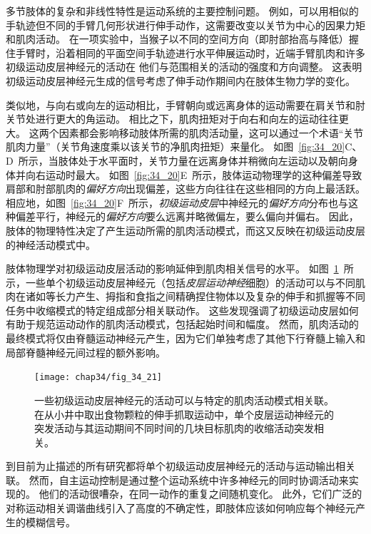 多节肢体的复杂和非线性特性是运动系统的主要控制问题。
例如，可以用相似的手轨迹但不同的手臂几何形状进行伸手动作，这需要改变以关节为中心的因果力矩和肌肉活动。
在一项实验中，当猴子以不同的空间方向（即肘部抬高与降低）握住手臂时，沿着相同的平面空间手轨迹进行水平伸展运动时，近端手臂肌肉和许多初级运动皮层神经元的活动在 他们与范围相关的活动的强度和方向调整。
这表明初级运动皮层神经元生成的信号考虑了伸手动作期间内在肢体生物力学的变化。


类似地，与向右或向左的运动相比，手臂朝向或远离身体的运动需要在肩关节和肘关节处进行更大的角运动。
相比之下，肌肉扭矩对于向右和向左的运动往往更大。
这两个因素都会影响移动肢体所需的肌肉活动量，这可以通过一个术语“关节肌肉力量”（关节角速度乘以该关节的净肌肉扭矩）来量化。
如图~\ref{fig:34_20}C、D~所示，当肢体处于水平面时，关节力量在远离身体并稍微向左运动以及朝向身体并向右运动时最大。
如图~\ref{fig:34_20}E~所示，肢体运动物理学的这种偏差导致肩部和肘部肌肉的\textit{偏好方向}出现偏差，这些方向往往在这些相同的方向上最活跃。
相应地，如图~\ref{fig:34_20}F~所示，\textit{初级运动皮层}中神经元的\textit{偏好方向}分布也与这种偏差平行，神经元的\textit{偏好方向}要么远离并略微偏左，要么偏向并偏右。
因此，肢体的物理特性决定了产生运动所需的肌肉活动模式，而这又反映在初级运动皮层的神经活动模式中。


肢体物理学对初级运动皮层活动的影响延伸到肌肉相关信号的水平。
如图~\ref{fig:34_21}~所示，一些单个初级运动皮层神经元（包括\textit{皮层运动神经}细胞）的活动可以与不同肌肉在诸如等长力产生、拇指和食指之间精确捏住物体以及复杂的伸手和抓握等不同任务中收缩模式的特定组成部分相关联动作。
这些发现强调了初级运动皮层如何有助于规范运动动作的肌肉活动模式，包括起始时间和幅度。
然而，肌肉活动的最终模式将仅由脊髓运动神经元产生，因为它们单独考虑了其他下行脊髓上输入和局部脊髓神经元间过程的额外影响。


\begin{figure}[htbp]
	\centering
	\texttt{[image: chap34/fig\_34\_21]}
	\caption{一些初级运动皮层神经元的活动可以与特定的肌肉活动模式相关联。
		在从小井中取出食物颗粒的伸手抓取运动中，单个皮层运动神经元的突发活动与其运动期间不同时间的几块目标肌肉的收缩活动突发相关\cite{griffin2008corticomotoneuronal}。}
	\label{fig:34_21}
\end{figure}


到目前为止描述的所有研究都将单个初级运动皮层神经元的活动与运动输出相关联。
然而，自主运动控制是通过整个运动系统中许多神经元的同时协调活动来实现的。
他们的活动很嘈杂，在同一动作的重复之间随机变化。
此外，它们广泛的对称运动相关调谐曲线引入了高度的不确定性，即肢体应该如何响应每个神经元产生的模糊信号。


